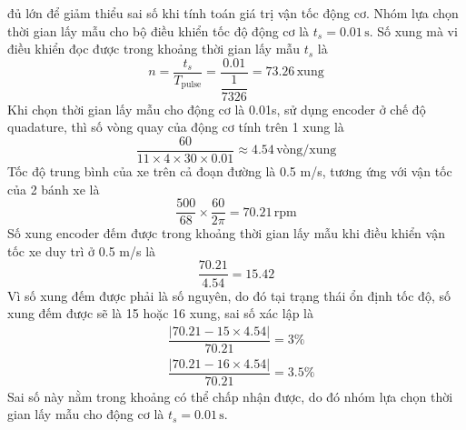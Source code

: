                đủ lớn để giảm thiểu sai số khi tính toán giá trị vận tốc động cơ. Nhóm lựa chọn thời gian lấy mẫu cho bộ điều khiển tốc độ động cơ là $t_s = 0.01 \,\mathrm{s}$. Số xung mà vi điều khiển đọc được trong khoảng thời gian lấy mẫu $t_s$ là 
               \begin{equation*}
                    n = \dfrac{t_s}{T_{\text{pulse}}} = \dfrac{0.01}{\dfrac{1}{7326}} = 73.26 \,\mathrm{xung}
               \end{equation*}
               \hspace*{0.6cm}Khi chọn thời gian lấy mẫu cho động cơ là 0.01s, sử dụng encoder ở chế độ quadature, thì số vòng quay của động cơ tính trên 1 xung là
               \begin{equation*}
                    \dfrac{60}{11 \times 4 \times 30 \times 0.01} \approx 4.54 \,\text{vòng/xung}
               \end{equation*}
               \hspace*{0.6cm}Tốc độ trung bình của xe trên cả đoạn đường là 0.5 m/s, tương ứng với vận tốc của 2 bánh xe là
               \begin{equation*}
                    \dfrac{500}{68} \times \dfrac{60}{2 \pi} = 70.21 \,\mathrm{rpm}
               \end{equation*}
               \hspace*{0.6cm}Số xung encoder đếm được trong khoảng thời gian lấy mẫu khi điều khiển vận tốc xe duy trì ở 0.5 m/s là
               \begin{equation*}
                    \dfrac{70.21}{4.54} = 15.42
               \end{equation*}
               \hspace*{0.6cm}Vì số xung đếm được phải là số nguyên, do đó tại trạng thái ổn định tốc độ, số xung đếm được sẽ là 15 hoặc 16 xung, sai số xác lập là
               \begin{align*}
                    &\dfrac{|70.21 - 15 \times 4.54|}{70.21} = 3 \%\\
                    &\dfrac{|70.21 - 16 \times 4.54|}{70.21} = 3.5 \%
               \end{align*}
               \hspace*{0.6cm}Sai số này nằm trong khoảng có thể chấp nhận được, do đó nhóm lựa chọn thời gian lấy mẫu cho động cơ là $t_s = 0.01 \,\mathrm{s}$.


               
